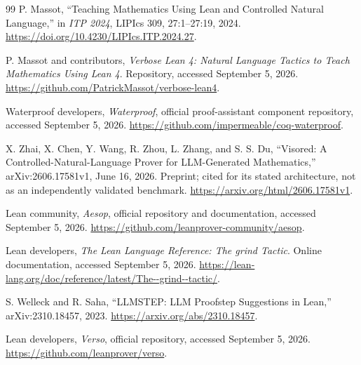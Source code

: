 \documentclass[11pt,a4paper]{article}
\theoremstyle{definition}
\theoremstyle{remark}
\begin{document}
\begin{thebibliography}{99}
P. Massot, ``Teaching Mathematics Using Lean and Controlled Natural Language,'' in \emph{ITP 2024}, LIPIcs 309, 27:1--27:19, 2024.
\url{https://doi.org/10.4230/LIPIcs.ITP.2024.27}.

P. Massot and contributors, \emph{Verbose Lean 4: Natural Language Tactics to Teach Mathematics Using Lean 4}. Repository, accessed September 5, 2026.
\url{https://github.com/PatrickMassot/verbose-lean4}.

Waterproof developers, \emph{Waterproof}, official proof-assistant component repository, accessed September 5, 2026.
\url{https://github.com/impermeable/coq-waterproof}.

X. Zhai, X. Chen, Y. Wang, R. Zhou, L. Zhang, and S. S. Du, ``Visored: A Controlled-Natural-Language Prover for LLM-Generated Mathematics,'' arXiv:2606.17581v1, June 16, 2026. Preprint; cited for its stated architecture, not as an independently validated benchmark.
\url{https://arxiv.org/html/2606.17581v1}.

Lean community, \emph{Aesop}, official repository and documentation, accessed September 5, 2026.
\url{https://github.com/leanprover-community/aesop}.

Lean developers, \emph{The Lean Language Reference: The grind Tactic}. Online documentation, accessed September 5, 2026.
\url{https://lean-lang.org/doc/reference/latest/The--grind--tactic/}.

S. Welleck and R. Saha, ``LLMSTEP: LLM Proofstep Suggestions in Lean,'' arXiv:2310.18457, 2023.
\url{https://arxiv.org/abs/2310.18457}.

Lean developers, \emph{Verso}, official repository, accessed September 5, 2026.
\url{https://github.com/leanprover/verso}.
\end{thebibliography}
\end{document}
